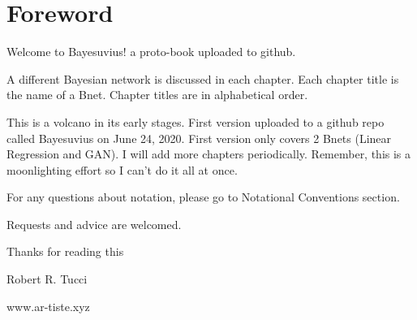 \chapter*{Foreword}

Welcome to Bayesuvius! a proto-book uploaded to github.

A different Bayesian network is discussed
 in each chapter. Each chapter title is 
the name of a Bnet. Chapter titles are
 in alphabetical order.

This is a volcano in its early stages.
 First version uploaded to a github repo 
called Bayesuvius on June 24, 2020. 
First version only covers 2 Bnets
(Linear Regression and GAN). 
I will add more chapters periodically.
 Remember, this is a moonlighting effort 
so I can't do it all at once.

For any questions about notation, 
please go to Notational Conventions section.

Requests and advice are welcomed.


\bigskip
\noindent Thanks for reading this

\noindent Robert R. Tucci

\noindent www.ar-tiste.xyz

